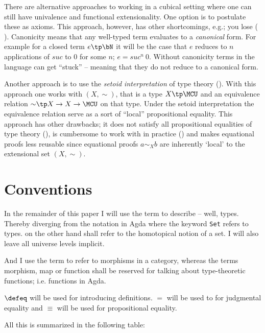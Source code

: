 There are alternative approaches to working in a cubical setting where one can
still have univalence and functional extensionality. One option is to postulate
these as axioms. This approach, however, has other shortcomings, e.g.; you lose
 ( \cite{huber-2016}). Canonicity means that any
well-typed term evaluates to a \emph{canonical} form. For example for a closed
term $e \tp \bN$ it will be the case that $e$ reduces to $n$ applications of
$\mathit{suc}$ to $0$ for some $n$; $e = \mathit{suc}^n\ 0$. Without canonicity
terms in the language can get ``stuck'' -- meaning that they do not reduce to a
canonical form.

Another approach is to use the \emph{setoid interpretation} of type theory
(\cite{hofmann-1995,huber-2016}). With this approach one works with
 $(X, \sim)$, that is a type $X \tp \MCU$ and an
equivalence relation $\mathord{\sim} \tp X \to X \to \MCU$ on that type. Under the setoid
interpretation the equivalence relation serve as a sort of ``local''
propositional equality. This approach has other drawbacks; it does not satisfy
all propositional equalities of type theory (), is
cumbersome to work with in practice (\cite[p. 4]{huber-2016}) and makes
equational proofs less reusable since equational proofs $a \sim_{X} b$ are
inherently `local' to the extensional set $(X , \sim)$.

\section{Conventions}

In the remainder of this paper I will use the term  to describe --
well, types. Thereby diverging from the notation in Agda where the keyword
\texttt{Set} refers to types.  on the other hand shall refer to the
homotopical notion of a set. I will also leave all universe levels implicit.

And I use the term  to refer to morphisms in a category, whereas
the terms morphism, map or function shall be reserved for talking about
type-theoretic functions; i.e. functions in Agda.

$\defeq$ will be used for introducing definitions. $=$ will be used to for
judgmental equality and $\equiv$ will be used for propositional equality.

All this is summarized in the following table:

